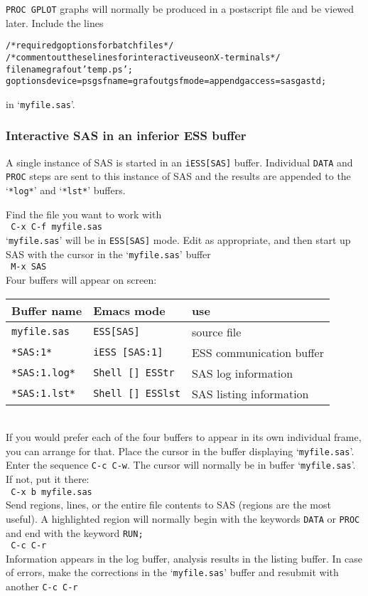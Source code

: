 \documentclass{article}
\newcommand{\stexttt}[1]{{\small\texttt{#1}}}
\newcommand{\elcode}[1]{\\{\stexttt{\hspace*{2em} #1}}\\}
\newenvironment{Salltt}{\small\begin{alltt}}{\end{alltt}}
\newcommand{\file}[1]{`\stexttt{#1}'}
\begin{document}
\stexttt{PROC GPLOT} graphs will normally be produced in a postscript
file and be viewed later.  Include the lines
\begin{Salltt}
    /* required goptions for batch files */
    /* comment out these lines for interactive use on X-terminals*/
    filename grafout 'temp.ps';
    goptions device=ps gsfname=grafout gsfmode=append gaccess=sasgastd;
\end{Salltt}
\noindent
in \file{myfile.sas}.


\subsubsection{Interactive SAS in an inferior ESS buffer}
A single instance of SAS is started in an \stexttt{iESS[SAS]} buffer.
Individual \stexttt{DATA} and \stexttt{PROC} steps are sent to this
instance of SAS and the results are appended to the \file{*log*}
and \file{*lst*} buffers.

Find the file you want to work with
    \elcode{C-x C-f myfile.sas}
\file{myfile.sas} will be in \stexttt{ESS[SAS]} mode.
Edit as appropriate, and then start up SAS with the cursor in
the \file{myfile.sas} buffer
    \elcode{M-x SAS}
Four buffers will appear on screen:\\
\begin{tabular}{lll}  \hline
  Buffer name     & Emacs mode         & use\\  \hline
  \stexttt{myfile.sas}  & \stexttt{ESS[SAS]}       &source file   \\
  \stexttt{*SAS:1*}     & \stexttt{iESS [SAS:1]}   &ESS communication buffer \\
  \stexttt{*SAS:1.log*} & \stexttt{Shell [] ESStr} &SAS log information      \\
  \stexttt{*SAS:1.lst*} & \stexttt{Shell [] ESSlst}&SAS listing information  \\
  \hline
\end{tabular}\\[1ex]
If you would prefer each of the four buffers to appear in its own
individual frame, you can arrange for that.  Place the cursor in the
buffer displaying \file{myfile.sas}.  Enter the sequence \stexttt{C-c C-w}.
The cursor will normally be in buffer \file{myfile.sas}.  If
not, put it there:
    \elcode{C-x b myfile.sas}
Send regions, lines, or the entire file contents to SAS
(regions are the most useful).  A highlighted region will normally
begin with the keywords \stexttt{DATA} or \stexttt{PROC} and end with the
keyword \stexttt{RUN;}
    \elcode{C-c C-r}
Information appears in the log buffer, analysis results in the
listing buffer.  In case of errors, make the corrections in the
\file{myfile.sas} buffer and resubmit with another \stexttt{C-c C-r}
\end{document}
